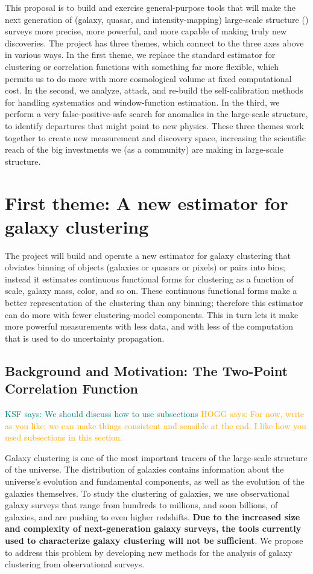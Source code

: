 \documentclass[12pt, fullpage, letterpaper]{article}
\newcommand{\KSF}[1]{\textcolor{teal}{KSF says: #1}}
\newcommand{\HOGG}[1]{\textcolor{orange}{HOGG says: #1}}
\begin{document}
This proposal is to build and exercise general-purpose tools that will
make the next generation of (galaxy, quasar, and intensity-mapping)
large-scale structure (\LSS) surveys more precise, more powerful, and
more capable of making truly new discoveries.
The project has three themes, which connect to the three axes above in
various ways.
In the first theme, we replace the standard estimator for clustering or
correlation functions with something far more flexible, which permits us
to do more with more cosmological volume at fixed computational cost.
In the second, we analyze, attack, and re-build the self-calibration 
methods for handling systematics and window-function estimation.
In the third, we perform a very false-positive-safe search for anomalies
in the large-scale structure, to identify departures that might point to
new physics.
These three themes work together to create new measurement and discovery space,
increasing the scientific reach of the big investments we (as a community)
are making in large-scale structure.

\section{First theme: A new estimator for galaxy clustering}

The project will build and operate a new estimator for
galaxy clustering that obviates binning of objects (galaxies or
quasars or pixels) or pairs into bins; instead it estimates continuous
functional forms for clustering as a function of scale, galaxy mass,
color, and so on.
These continuous functional forms make a better representation of the
clustering than any binning; therefore this estimator can do more with
fewer clustering-model components.
This in turn lets it make more powerful measurements with less data,
and with less of the computation that is used to do uncertainty
propagation.

\subsection{Background and Motivation: The Two-Point Correlation Function}

\KSF{We should discuss how to use subsections} \HOGG{For now, write as you like; we can make things consistent and sensible at the end. I like how you used subsections in this section.}

Galaxy clustering is one of the most important tracers of the large-scale structure of the universe.
The distribution of galaxies contains information about the universe's evolution and fundamental components, as well as the evolution of the galaxies themselves.
To study the clustering of galaxies, we use observational galaxy surveys that range from hundreds to millions, and soon billions, of galaxies, and are pushing to even higher redshifts.
\textbf{Due to the increased size and complexity of next-generation galaxy surveys, the tools currently used to characterize galaxy clustering will not be sufficient}.
We propose to address this problem by developing new methods for the analysis of galaxy clustering from observational surveys.
\end{document}
